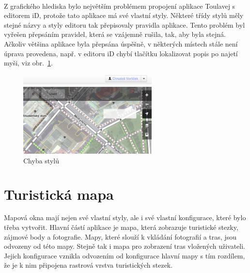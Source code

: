 \documentclass[11pt,a4paper,titlepage,oneside]{book}
\begin{document}
			\paragraph{}\label{par:grafikaId} Z grafického hlediska bylo největším problémem propojení aplikace Toulavej s editorem iD, protože tato aplikace má své vlastní styly. Některé třídy stylů měly stejné názvy a  styly editoru tak přepisovaly pravidla aplikace. Tento problém byl vyřešen přepsáním pravidel, která se vzájemně rušila, tak, aby byla stejná. Ačkoliv většina aplikace byla přepsána úspěšně, v některých místech stále není úprava provedena, např. v editoru iD chybí tlačítku lokalizovat popis po najetí myši, viz obr.~\ref{fig:error_locate}.
		\begin{figure}[!h]
			\begin{center}
				\includegraphics[width=7cm]{obrazky/toulavej/chyba_locate.png}
				\caption{Chyba stylů}
				\label{fig:error_locate}
			\end{center}
		\end{figure}	




		\section{Turistická mapa}
			\paragraph{} Mapová okna mají nejen své vlastní styly, ale i své vlastní konfigurace, které bylo třeba vytvořit. Hlavní částí aplikace je mapa, která zobrazuje turistické stezky, zájmové body a fotografie. Mapy, které slouží k vkládání fotografií a tras, jsou odvozeny od této mapy. Stejně tak i mapa pro zobrazení tras vložených uživateli. Jejich konfigurace vznikla odvozením od konfigurace hlavní mapy s tím rozdílem, že je k nim připojena rastrová vrstva turistických stezek.
\end{document}
